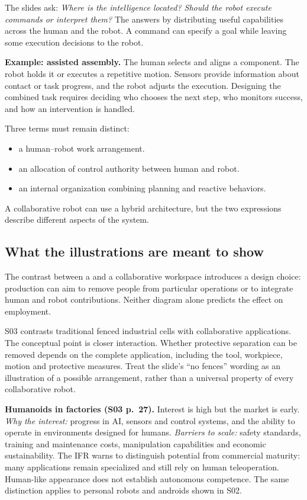 The slides ask: \emph{Where is the intelligence located? Should the robot execute commands or interpret them?} The  answers by distributing useful capabilities across the human and the robot. A command can specify a goal while leaving some execution decisions to the robot.

\textbf{Example: assisted assembly.} The human selects and aligns a component. The robot holds it or executes a repetitive motion. Sensors provide information about contact or task progress, and the robot adjusts the execution. Designing the combined task requires deciding who chooses the next step, who monitors success, and how an intervention is handled.

Three terms must remain distinct:
\begin{itemize}
\item {} a human--robot work arrangement.
\item {} an allocation of control authority between human and robot.
\item {} an internal organization combining planning and reactive behaviors.
\end{itemize}
A collaborative robot can use a hybrid architecture, but the two expressions describe different aspects of the system.

\subsection{What the illustrations are meant to show}
The contrast between a  and a collaborative workspace introduces a design choice: production can aim to remove people from particular operations or to integrate human and robot contributions. Neither diagram alone predicts the effect on employment.

S03 contrasts traditional fenced industrial cells with collaborative applications. The conceptual point is closer interaction. Whether protective separation can be removed depends on the complete application, including the tool, workpiece, motion and protective measures. Treat the slide's ``no fences'' wording as an illustration of a possible arrangement, rather than a universal property of every collaborative robot.

\textbf{Humanoids in factories (S03 p.~27).} Interest is high but the market is early. \emph{Why the interest:} progress in AI, sensors and control systems, and the ability to operate in environments designed for humans. \emph{Barriers to scale:} safety standards, training and maintenance costs, manipulation capabilities and economic sustainability. The IFR warns to distinguish potential from commercial maturity: many applications remain specialized and still rely on human teleoperation. Human-like appearance does not establish autonomous competence. The same distinction applies to personal robots and androids shown in S02.

